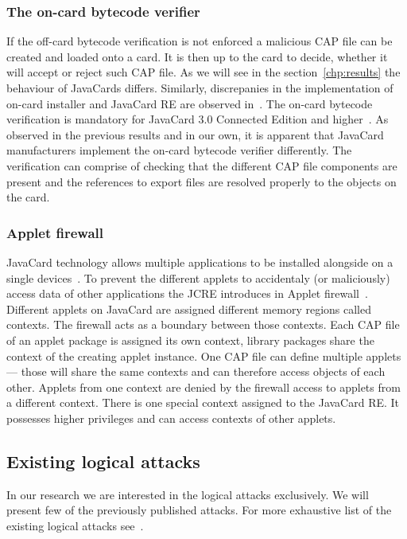 \documentclass{../llncs/llncs}
\begin{document}
    \subsubsection{The on-card bytecode verifier}

    If the off-card bytecode verification is not enforced a malicious CAP file can be created and loaded onto a card. It is then up to the card to decide, whether it will accept or reject such CAP file. As we will see in the section~\ref{chp:results} the behaviour of JavaCards differs. Similarly, discrepanies in the implementation of on-card installer and JavaCard RE are observed in~\cite{lanettrojan}. The on-card bytecode verification is mandatory for JavaCard 3.0 Connected Edition and higher~\cite{barbusecond}. As observed in the previous results and in our own, it is apparent that JavaCard manufacturers implement the on-card bytecode verifier differently.
    The verification can comprise of checking that the different CAP file components are present and the references to export files are resolved properly to the objects on the card.


    \subsubsection{Applet firewall}

    JavaCard technology allows multiple applications to be installed alongside on a single devices~\cite{jcspecs31download}. To prevent the different applets to accidentaly (or maliciously) access data of other applications the JCRE introduces in Applet firewall~\cite{jcspecs31download}. Different applets on JavaCard are assigned different memory regions called contexts. The firewall acts as a boundary between those contexts. Each CAP file of an applet package is assigned its own context, library packages share the context of the creating applet instance. One CAP file can define multiple applets --- those will share the same contexts and can therefore access objects of each other. Applets from one context are denied by the firewall access to applets from a different context.
    There is one special context assigned to the JavaCard RE. It possesses higher privileges and can access contexts of other applets.

    \subsection{Existing logical attacks}
    In our research we are interested in the logical attacks exclusively. We will present few of the previously published attacks. For more exhaustive list of the existing logical attacks see~\cite{Kvapil2020thesis,sergei,se:oracle:part1,se:oracle:part2,se:oracle:part3}.
\end{document}

